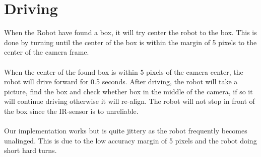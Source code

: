 \documentclass[a4paper,12pt]{article}
\begin{document}
\section{Driving}

When the Robot have found a box, it will try center the robot to the box. This is done by turning until the center of the box is within the margin of 5 pixels to the center of the camera frame.
\\\\
When the center of the found box is within 5 pixels of the camera center, the robot will drive forward for 0.5 seconds. 
After driving, the robot will take a picture, find the box and check whether box in the middle of the camera, if so it will continue driving otherwise it will re-align. 
The robot will not stop in front of the box since the IR-sensor is to unreliable. 
\\\\
Our implementation works but is quite jittery as the robot frequently becomes unalinged. This is due to the low accuracy margin of 5 pixels and the robot doing short hard turns.
\end{document}

